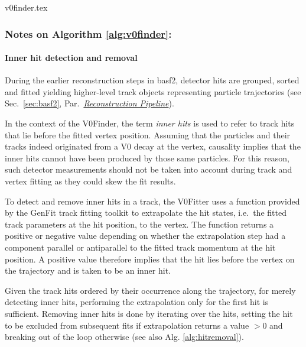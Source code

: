 \begin{algbox}{%
    \label{alg:v0finder}%
  }
  {v0finder.tex}
\end{algbox}

\subsubsection*{Notes on Algorithm \ref{alg:v0finder}:}\label{sec:v0fitter-alg-notes}

\paragraph{Inner hit detection and removal}
During the earlier reconstruction steps in basf2, detector hits are grouped, sorted and fitted yielding higher-level track objects representing particle trajectories (see Sec.\ \ref{sec:basf2}, Par.\ \hyperref[par:reconstruction-pipeline]{\emph{Reconstruction Pipeline}}).

In the context of the V0Finder, the term \emph{inner hits} is used to refer to track hits that lie before the fitted vertex position.
Assuming that the particles and their tracks indeed originated from a V0 decay at the vertex, causality implies that the inner hits cannot have been produced by those same particles.
For this reason, such detector measurements should not be taken into account during track and vertex fitting as they could skew the fit results.

To detect and remove inner hits in a track, the V0Fitter uses a function provided by the GenFit \cite{genfit} track fitting toolkit to extrapolate the hit states, i.e.\ the fitted track parameters at the hit position, to the vertex.
The function returns a positive or negative value depending on whether the extrapolation step had a component parallel or antiparallel to the fitted track momentum at the hit position.
A positive value therefore implies that the hit lies before the vertex on the trajectory and is taken to be an inner hit.

Given the track hits ordered by their occurrence along the trajectory, for merely detecting inner hits, performing the extrapolation only for the first hit is sufficient. 
Removing inner hits is done by iterating over the hits, setting the hit to be excluded from subsequent fits if extrapolation returns a value $> 0$ and breaking out of the loop otherwise (see also Alg. \ref{alg:hitremoval}).


